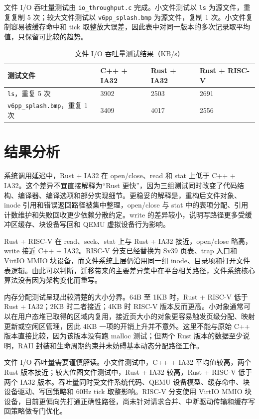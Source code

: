文件 I/O 吞吐量测试由 \texttt{io\_throughput.c} 完成。小文件测试以 \texttt{ls} 为源文件，重复复制 5 次；较大文件测试以 \texttt{v6pp\_splash.bmp} 为源文件，复制 1 次。小文件复制容易被缓存命中和 tick 取整放大误差，因此表中对同一版本的多次记录取平均值，只保留可比较的趋势。

\begin{table}[htbp]
  \centering
  \caption{文件 I/O 吞吐量测试结果（KB/s）}\label{tab:io-bench}
  \begin{tabular}{p{}p{}p{}p{}}
    \toprule
    \textbf{测试文件} & \textbf{C++ + IA32} & \textbf{Rust + IA32} & \textbf{Rust + RISC-V} \\
    \midrule
    \texttt{ls}，重复 5 次 & 3902 & 2503 & 2691 \\
    \texttt{v6pp\_splash.bmp}，重复 1 次 & 3409 & 4017 & 2556 \\
    \bottomrule
  \end{tabular}
\end{table}

\section{结果分析}

系统调用延迟中，Rust + IA32 在 open/close、read 和 stat 上低于 C++ + IA32。这个差异不宜直接解释为“Rust 更快”，因为三组测试同时改变了代码结构、编译器、编译选项和部分实现细节。更稳妥的解释是，重构后文件对象、inode 引用和错误返回路径被集中整理，open/close 与 stat 中的表项分配、引用计数维护和失败回收更少依赖分散约定。write 的差异较小，说明写路径更多受缓冲区缓存、块设备写回和 QEMU 虚拟设备行为影响。

Rust + RISC-V 在 read、seek、stat 上与 Rust + IA32 接近，open/close 略高，write 接近 C++ + IA32。RISC-V 分支已经替换为 Sv39 页表、trap 入口和 VirtIO MMIO 块设备，而文件系统上层仍沿用同一组 inode、目录项和打开文件表逻辑。由此可以判断，迁移带来的主要差异集中在平台相关路径，文件系统核心算法没有因为架构变化而重写。

内存分配测试呈现出较清楚的大小分界。64B 至 1KB 时，Rust + RISC-V 低于 Rust + IA32；2KB 时二者接近；4KB 时 RISC-V 版本反而更高。小对象通常可以在用户态堆已取得的区域内复用，接近页大小的对象更容易触发页级分配、映射更新或空闲区管理，因此 4KB 一项的开销上升并不意外。这里不能与原始 C++ 版本直接比较，因为该版本没有跑 malloc 测试；但两个 Rust 版本的数据至少说明，RAII 封装和生命周期约束并未妨碍基本动态分配路径工作。

文件 I/O 吞吐量需要谨慎解读。小文件测试中，C++ + IA32 平均值较高，两个 Rust 版本接近；较大位图文件测试中，Rust + IA32 较高，Rust + RISC-V 低于两个 IA32 版本。吞吐量同时受文件系统代码、QEMU 设备模型、缓存命中、块设备驱动、写回策略和 60Hz tick 取整影响。RISC-V 分支使用 VirtIO MMIO 块设备，目前更偏向先打通正确性路径，尚未针对请求合并、中断驱动传输和缓存写回策略做专门优化。

